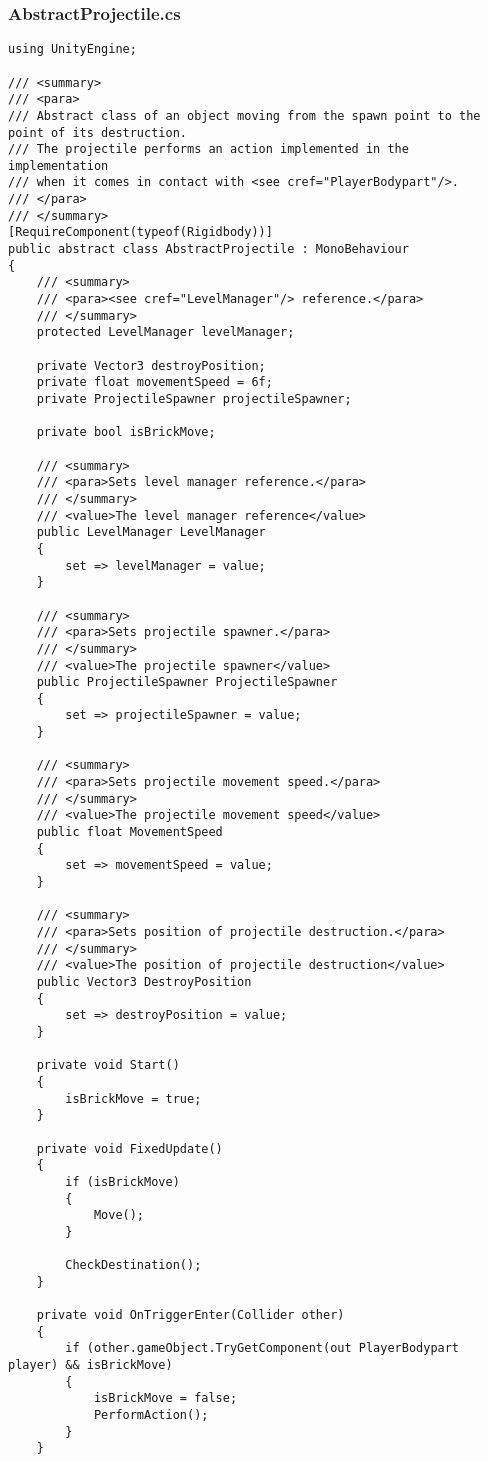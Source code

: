 \subsubsection*{AbstractProjectile.cs}
\begin{verbatim}
using UnityEngine;

/// <summary>
/// <para>
/// Abstract class of an object moving from the spawn point to the point of its destruction.
/// The projectile performs an action implemented in the implementation
/// when it comes in contact with <see cref="PlayerBodypart"/>.
/// </para>
/// </summary>
[RequireComponent(typeof(Rigidbody))]
public abstract class AbstractProjectile : MonoBehaviour
{
    /// <summary>
    /// <para><see cref="LevelManager"/> reference.</para>
    /// </summary>
    protected LevelManager levelManager;

    private Vector3 destroyPosition;
    private float movementSpeed = 6f;
    private ProjectileSpawner projectileSpawner;

    private bool isBrickMove;

    /// <summary>
    /// <para>Sets level manager reference.</para>
    /// </summary>
    /// <value>The level manager reference</value>
    public LevelManager LevelManager
    {
        set => levelManager = value;
    }

    /// <summary>
    /// <para>Sets projectile spawner.</para>
    /// </summary>
    /// <value>The projectile spawner</value>
    public ProjectileSpawner ProjectileSpawner
    {
        set => projectileSpawner = value;
    }

    /// <summary>
    /// <para>Sets projectile movement speed.</para>
    /// </summary>
    /// <value>The projectile movement speed</value>
    public float MovementSpeed
    {
        set => movementSpeed = value;
    }

    /// <summary>
    /// <para>Sets position of projectile destruction.</para>
    /// </summary>
    /// <value>The position of projectile destruction</value>
    public Vector3 DestroyPosition
    {
        set => destroyPosition = value;
    }

    private void Start()
    {
        isBrickMove = true;
    }

    private void FixedUpdate()
    {
        if (isBrickMove)
        {
            Move();
        }

        CheckDestination();
    }

    private void OnTriggerEnter(Collider other)
    {
        if (other.gameObject.TryGetComponent(out PlayerBodypart player) && isBrickMove)
        {
            isBrickMove = false;
            PerformAction();
        }
    }


\end{verbatim}
